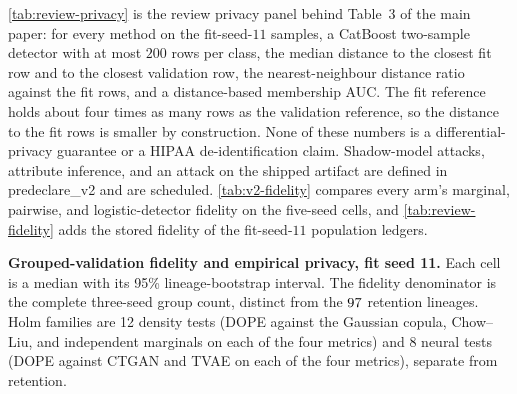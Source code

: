 \documentclass{article}
\begin{document}
\cref{tab:review-privacy} is the review privacy panel behind Table~3 of the main paper: for every method on the fit-seed-$11$ samples, a CatBoost two-sample detector with at most $200$ rows per class, the median distance to the closest fit row and to the closest validation row, the nearest-neighbour distance ratio against the fit rows, and a distance-based membership AUC. The fit reference holds about four times as many rows as the validation reference, so the distance to the fit rows is smaller by construction. None of these numbers is a differential-privacy guarantee or a HIPAA de-identification claim. Shadow-model attacks, attribute inference, and an attack on the shipped artifact are defined in predeclare\_v2 and are scheduled. \cref{tab:v2-fidelity} compares every arm's marginal, pairwise, and logistic-detector fidelity on the five-seed cells, and \cref{tab:review-fidelity} adds the stored fidelity of the fit-seed-$11$ population ledgers.

\begingroup
\scriptsize
\setlength{\tabcolsep}{2pt}



\endgroup

\begin{table}[t]
\caption{\textbf{Grouped-validation fidelity and empirical privacy, fit seed 11.} Each cell is a median with its 95\% lineage-bootstrap interval. The fidelity denominator is the complete three-seed group count, distinct from the $\NDopeCb$ retention lineages. Holm families are 12 density tests (DOPE against the Gaussian copula, Chow--Liu, and independent marginals on each of the four metrics) and 8 neural tests (DOPE against CTGAN and TVAE on each of the four metrics), separate from retention.}
\label{tab:fidelity-hist}
\centering
\footnotesize
\setlength{\tabcolsep}{2pt}
\resizebox{\linewidth}{!}{\begin{minipage}{7.16in}\end{minipage}}
\end{table}
\end{document}
